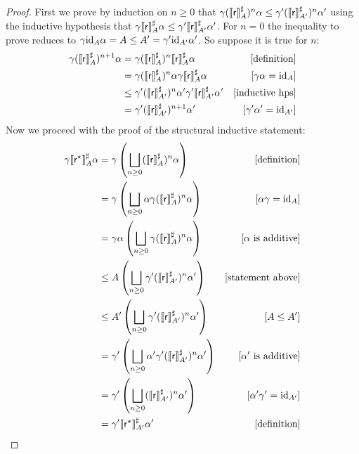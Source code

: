 \begin{proof}
	\proofcase{($\regr^{\kstar}$)}
	First we prove by induction on $n \ge 0$ that $\gamma (\llbracket\mathsf{r}\rrbracket^{\sharp}_{A})^n \alpha \le \gamma' (\llbracket\mathsf{r}\rrbracket^{\sharp}_{A'})^n \alpha'$ using the inductive hypothesis that $\gamma \llbracket\mathsf{r}\rrbracket^{\sharp}_{A} \alpha \le \gamma' \llbracket\mathsf{r}\rrbracket^{\sharp}_{A'} \alpha'$. For $n = 0$ the inequality to prove reduces to $\gamma \text{id}_A \alpha = A \le A' = \gamma' \text{id}_{A'} \alpha'$. So suppose it is true for $n$:
	\begin{align*}
		\gamma (\llbracket\mathsf{r}\rrbracket^{\sharp}_{A})^{n+1} \alpha &= \gamma (\llbracket\mathsf{r}\rrbracket^{\sharp}_{A})^n \llbracket\mathsf{r}\rrbracket^{\sharp}_{A} \alpha &[\text{definition}]\\
		&= \gamma (\llbracket\mathsf{r}\rrbracket^{\sharp}_{A})^n \alpha \gamma \llbracket\mathsf{r}\rrbracket^{\sharp}_{A} \alpha &[\gamma \alpha = \text{id}_A] \\
		&\le \gamma' (\llbracket\mathsf{r}\rrbracket^{\sharp}_{A'})^n \alpha' \gamma' \llbracket\mathsf{r}\rrbracket^{\sharp}_{A'} \alpha' &[\text{inductive hps}] \\
		&= \gamma' (\llbracket\mathsf{r}\rrbracket^{\sharp}_{A'})^{n+1} \alpha' &[\gamma' \alpha' = \text{id}_{A'}]
	\end{align*}
	Now we proceed with the proof of the structural inductive statement:
	\begin{align*}
		\gamma \llbracket\mathsf{r}^\star\rrbracket^{\sharp}_{A} \alpha &= \gamma \left( \bigsqcup_{n \ge 0} (\llbracket\mathsf{r}\rrbracket^{\sharp}_{A})^n \alpha \right) &[\text{definition}]\\
		&= \gamma \left( \bigsqcup_{n \ge 0} \alpha \gamma (\llbracket\mathsf{r}\rrbracket^{\sharp}_{A})^n \alpha \right) &[\alpha \gamma = \text{id}_A] \\
		&= \gamma \alpha \left( \bigsqcup_{n \ge 0} \gamma (\llbracket\mathsf{r}\rrbracket^{\sharp}_{A})^n \alpha \right) &[\alpha \text{ is additive}] \\
		&\le A \left( \bigsqcup_{n \ge 0} \gamma' (\llbracket\mathsf{r}\rrbracket^{\sharp}_{A'})^n \alpha' \right) &[\text{statement above}] \\
		&\le A' \left( \bigsqcup_{n \ge 0} \gamma' (\llbracket\mathsf{r}\rrbracket^{\sharp}_{A'})^n \alpha' \right) &[A \le A'] \\
		&= \gamma' \left( \bigsqcup_{n \ge 0} \alpha' \gamma' (\llbracket\mathsf{r}\rrbracket^{\sharp}_{A'})^n \alpha' \right) &[\alpha' \text{ is additive}] \\
		&= \gamma' \left( \bigsqcup_{n \ge 0} (\llbracket\mathsf{r}\rrbracket^{\sharp}_{A'})^n \alpha' \right) &[\alpha' \gamma' = \text{id}_{A'}] \\
		&= \gamma' \llbracket\mathsf{r}^\star\rrbracket^{\sharp}_{A'} \alpha' &[\text{definition}]
	\end{align*}
\end{proof}

